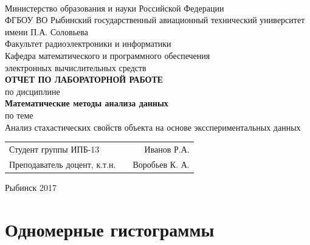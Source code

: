 \documentclass[a4paper,12pt]{article}
\begin{document}
\begin{titlepage}
\newpage

\

\begin{center}
	\large		
   	Министерство образования и науки Российской Федерации\\[0.5cm]
    	
	ФГБОУ ВО Рыбинский государственный авиационный технический университет имени П.А. Соловьева\\[1.0cm]

	Факультет радиоэлектроники и информатики\\[0.25cm]
		
	Кафедра математического и программного обеспечения\\ электронных вычислительных средств\\[1.5cm]

	\Large
	\textbf{\textsc{ОТЧЕТ ПО ЛАБОРАТОРНОЙ РАБОТЕ}}\\[0.25cm]
	по  дисциплине\\
	\textbf{Математические методы анализа данных}\\[0.5cm]
	
	по теме\\
	Анализ стахастических свойств объекта на основе эксспериментальных данных\\

\end{center}

\vfill	
\begin{tabularx}{0.95\textwidth}{lXr}
Студент группы ИПБ-13 			& &	Иванов Р.А. \\
Преподаватель доцент, к.т.н.	& & Воробьев К. А.\\
\end{tabularx}

\vspace{1.5cm}
\center Рыбинск 2017
\end{titlepage}	

\tableofcontents

\newpage\section{Одномерные гистограммы} 
\end{document}
